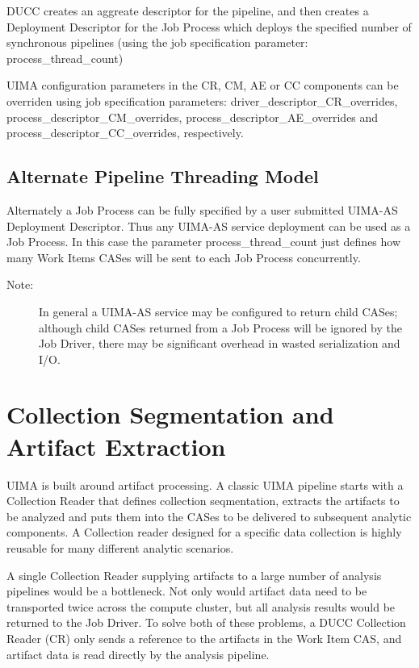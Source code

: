    DUCC creates an aggreate descriptor for the pipeline, and then creates a
   Deployment Descriptor for the Job Process which deploys the specified number
   of synchronous pipelines (using the job specification parameter: process\_thread\_count)

   UIMA configuration parameters in the CR, CM, AE or CC components can be overriden using
   job specification parameters: driver\_descriptor\_CR\_overrides, process\_descriptor\_CM\_overrides,
   process\_descriptor\_AE\_overrides and process\_descriptor\_CC\_overrides, respectively.
   
   \subsection{Alternate Pipeline Threading Model}
   
   Alternately a Job Process can be fully specified by a user submitted UIMA-AS
   Deployment Descriptor. Thus any UIMA-AS service deployment can be used as a
   Job Process. In this case the parameter process\_thread\_count just defines
   how many Work Items CASes will be sent to each Job Process concurrently.
   
	\begin{description}
	    \item[Note:] In general a UIMA-AS service may be configured to
	    return child CASes; although child CASes returned from a Job Process will be
	    ignored by the Job Driver, there may be significant overhead in wasted
	    serialization and I/O.
	\end{description}

\section{Collection Segmentation and Artifact Extraction}

UIMA is built around artifact processing. A classic UIMA pipeline starts with
a Collection Reader that defines collection seqmentation, extracts the artifacts
to be analyzed and puts them into the CASes to be delivered to subsequent analytic components. 
A Collection reader designed for a specific data collection is highly reusable
for many different analytic scenarios.

A single Collection Reader supplying artifacts to a large number of analysis pipelines 
would be a bottleneck. Not only would artifact data need to be transported twice across
the compute cluster, but all analysis results would be returned to the Job Driver.
To solve both of these problems, a DUCC Collection Reader (CR) only sends a reference
to the artifacts in the Work Item CAS, and artifact data is read directly by the analysis pipeline.

